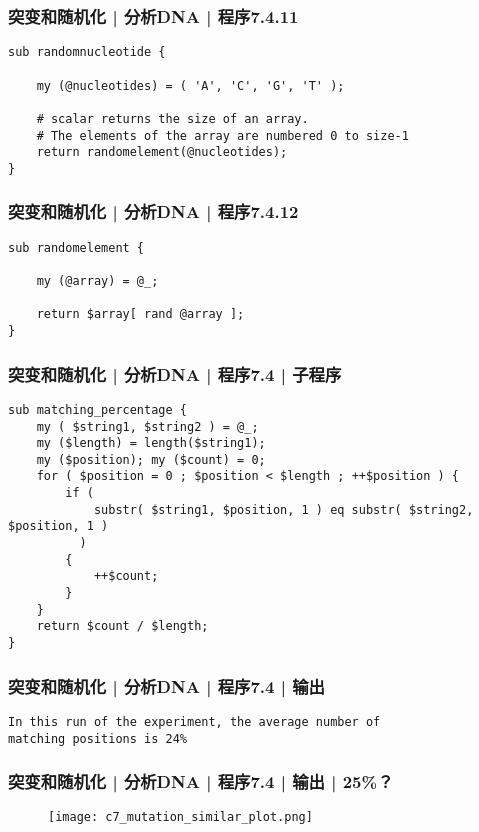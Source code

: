 \begin{frame}[fragile]
  \frametitle{突变和随机化 | 分析DNA | 程序7.4.11}
  \vspace{-1.5em}
\begin{lstlisting}[firstnumber=168]
sub randomnucleotide {

    my (@nucleotides) = ( 'A', 'C', 'G', 'T' );

    # scalar returns the size of an array.
    # The elements of the array are numbered 0 to size-1
    return randomelement(@nucleotides);
}
\end{lstlisting}
\end{frame}

\begin{frame}[fragile]
  \frametitle{突变和随机化 | 分析DNA | 程序7.4.12}
  \vspace{-1.5em}
\begin{lstlisting}[firstnumber=184]
sub randomelement {

    my (@array) = @_;

    return $array[ rand @array ];
}
\end{lstlisting}
\end{frame}

\begin{frame}[fragile]
  \frametitle{突变和随机化 | 分析DNA | 程序7.4 | \alert{子程序}}
  \vspace{-1.5em}
\begin{lstlisting}
sub matching_percentage {
    my ( $string1, $string2 ) = @_;
    my ($length) = length($string1);
    my ($position); my ($count) = 0;
    for ( $position = 0 ; $position < $length ; ++$position ) {
        if (
            substr( $string1, $position, 1 ) eq substr( $string2, $position, 1 )
          )
        {
            ++$count;
        }
    }
    return $count / $length;
}
\end{lstlisting}
\end{frame}

\begin{frame}[fragile]
  \frametitle{突变和随机化 | 分析DNA | 程序7.4 | 输出}
  \vspace{-1.5em}
\begin{lstlisting}[firstnumber=1]
In this run of the experiment, the average number of 
matching positions is 24%
\end{lstlisting}
\end{frame}

\begin{frame}
  \frametitle{突变和随机化 | 分析DNA | 程序7.4 | 输出 | 25\%？}
  \begin{figure}
    \centering
    \texttt{[image: c7\_mutation\_similar\_plot.png]}
  \end{figure}
\end{frame}

